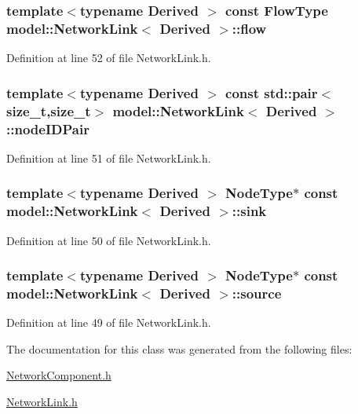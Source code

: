 \subsubsection[{flow}]{\setlength{\rightskip}{0pt plus 5cm}template$<$typename Derived $>$ const {\bf Flow\+Type} {\bf model\+::\+Network\+Link}$<$ Derived $>$\+::flow}\label{classmodel_1_1_network_link_a8c4ac993a9be36610bfac925143bc032}


Definition at line 52 of file Network\+Link.\+h.

\hypertarget{classmodel_1_1_network_link_a2eed0e5b229d53fd9f69b33df5187275}{}
\subsubsection[{node\+I\+D\+Pair}]{\setlength{\rightskip}{0pt plus 5cm}template$<$typename Derived $>$ const std\+::pair$<$size\+\_\+t,size\+\_\+t$>$ {\bf model\+::\+Network\+Link}$<$ Derived $>$\+::node\+I\+D\+Pair}\label{classmodel_1_1_network_link_a2eed0e5b229d53fd9f69b33df5187275}


Definition at line 51 of file Network\+Link.\+h.

\hypertarget{classmodel_1_1_network_link_ab30d55b16fb714b9ea6c8d30a6d5a1c6}{}
\subsubsection[{sink}]{\setlength{\rightskip}{0pt plus 5cm}template$<$typename Derived $>$ {\bf Node\+Type}$\ast$ const {\bf model\+::\+Network\+Link}$<$ Derived $>$\+::sink}\label{classmodel_1_1_network_link_ab30d55b16fb714b9ea6c8d30a6d5a1c6}


Definition at line 50 of file Network\+Link.\+h.

\hypertarget{classmodel_1_1_network_link_abd4d47e500d0fafe994f2663ce571faf}{}
\subsubsection[{source}]{\setlength{\rightskip}{0pt plus 5cm}template$<$typename Derived $>$ {\bf Node\+Type}$\ast$ const {\bf model\+::\+Network\+Link}$<$ Derived $>$\+::source}\label{classmodel_1_1_network_link_abd4d47e500d0fafe994f2663ce571faf}


Definition at line 49 of file Network\+Link.\+h.



The documentation for this class was generated from the following files\+:\begin{DoxyCompactItemize}
\item 
\hyperlink{_network_component_8h}{Network\+Component.\+h}\item 
\hyperlink{_network_link_8h}{Network\+Link.\+h}\end{DoxyCompactItemize}

